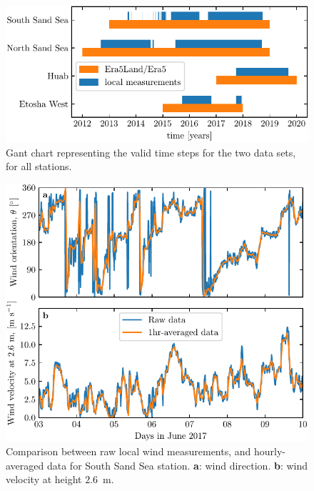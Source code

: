 \begin{figure}[p]
\centering
\includegraphics[scale=1]{Figures/Figure1_supp.pdf}
\caption{Gant chart representing the valid time steps for the two data sets, for all stations.}
\label{Fig1_supp}
\end{figure}

\begin{figure}[p]
\centering
\includegraphics[scale=1]{Figures/Figure2_supp.pdf}
\caption{Comparison between raw local wind measurements, and hourly-averaged data for South Sand Sea station. \textbf{a}: wind direction. \textbf{b}: wind velocity at height $2.6$~m.}
\label{Fig2_supp}
\end{figure}

